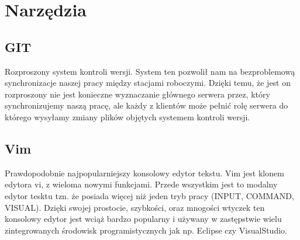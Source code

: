 \section{Narzędzia}
\label{cha:Narzędzia}

\subsection{GIT}
\label{sub:GIT}
Rozproszony system kontroli wersji. System ten pozwolił nam na bezproblemową synchronizacje naszej pracy między stacjami roboczymi. Dzięki temu, że jest on rozproszony nie jest konieczne wyznaczanie głównego serwera przez, który synchronizujemy naszą pracę, ale każdy z klientów może pełnić rolę serwera do którego wysyłamy zmiany plików objętych systemem kontroli wersji.


\subsection{Vim}
\label{sub:Vim}
Prawdopodobnie najpopularniejszy konsolowy edytor tekstu. Vim jest klonem edytora vi, z wieloma nowymi funkcjami. Przede wszystkim jest to modalny edytor tesktu tzn. że posiada więcej niż jeden tryb pracy (INPUT, COMMAND, VISUAL). Dzięki swojej prostocie, szybkości, oraz mnogości wtyczek ten konsolowy edytor jest wciąż bardzo popularny i używany w zastępstwie wielu zintegrowanych środowisk programistycznych jak np. Eclipse czy VisualStudio.  


